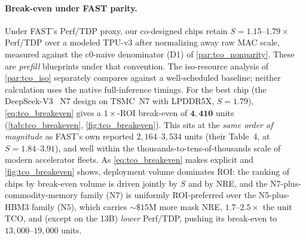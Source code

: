 \paragraph{Break-even under FAST parity.}
Under FAST's Perf/TDP proxy, our co-designed chips retain
$S=1.15\text{--}1.79\times$ Perf/TDP over a modeled TPU-v3 after normalizing away
raw MAC scale, measured against the c0-naive denominator (D1) of
\cref{par:tco_nonparity}. These are \emph{prefill} blueprints under that
convention. The iso-resource analysis of \cref{par:tco_iso} separately compares
against a well-scheduled baseline; neither calculation uses the native
full-inference timings. For the best chip (the DeepSeek-V3~\citep{deepseekv3report}
$\mathrm{N7}$ design on TSMC~N7 with LPDDR5X, $S=1.79$), \cref{eq:tco_breakeven} gives a
$1\times$-ROI break-even of $\mathbf{4{,}410}$ units (\cref{tab:tco_breakeven},
\cref{fig:tco_breakeven}). This sits at the \emph{same order of magnitude} as
FAST's own reported $2{,}164\text{--}3{,}534$ units (their Table~4, at
$S=1.84\text{--}3.91$), and well within the thousands-to-tens-of-thousands scale
of modern accelerator fleets. As \cref{eq:tco_breakeven} makes explicit and
\cref{fig:tco_breakeven} shows, deployment volume dominates ROI: the ranking of
chips by break-even volume is driven jointly by $S$ and by NRE, and the
N7-plus-commodity-memory family ($\mathrm{N7}$) is uniformly ROI-preferred over the
N5-plus-HBM3 family ($\mathrm{N5}$), which carries ${\sim}\$15\mathrm{M}$ more mask NRE,
$1.7\text{--}2.5\times$ the unit TCO, and (except on the 13B) \emph{lower}
Perf/TDP, pushing its break-even to $13{,}000\text{--}19{,}000$ units.

